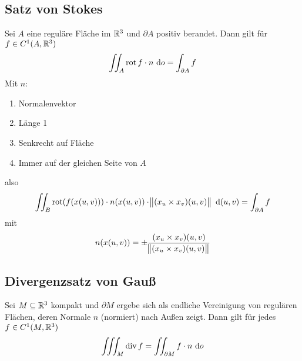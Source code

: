 \subsection{Satz von Stokes}
Sei $A$ eine reguläre Fläche im $\mathbb{R}^3$ und $\partial A$ positiv berandet. Dann
gilt für $f \in C^1(A, \mathbb{R}^3)$
\begin{equation*}
    \iint_A \operatorname{rot} f \cdot n \text{ d}o= \int_{\partial A} f
\end{equation*}
Mit $n$:
\begin{enumerate}[label = (\roman*)]
    \item Normalenvektor
    \item Länge 1
    \item Senkrecht auf Fläche
    \item Immer auf der gleichen Seite von $A$
\end{enumerate}
also
\begin{equation*}
    \iint_B \operatorname{rot}(f(x(u,v))) \cdot n(x(u,v)) \cdot \norm{(x_u \times x_v)(u,v)}
    \text{ d}(u,v) = \int_{\partial A} f
\end{equation*}
mit
\begin{equation*}
    n(x(u,v)) = \pm \frac{(x_u \times x_v)(u,v)}{\norm{(x_u \times x_v)(u,v)}}
\end{equation*}

\subsection{Divergenzsatz von Gauß}
Sei $M \subseteq \mathbb{R}^3$ kompakt und $\partial M$ ergebe sich als endliche
Vereinigung von regulären Flächen, deren Normale $n$ (normiert) nach Außen
zeigt. Dann gilt für jedes $f \in C^1(M, \mathbb{R}^3)$
\begin{equation*}
    \iiint_M \operatorname{div} f = \iint_{\partial M} f \cdot n \text{ d}o
\end{equation*}
